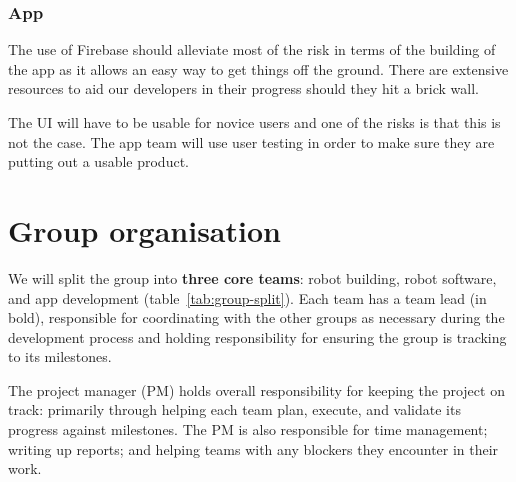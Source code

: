 \documentclass{article}
\begin{document}
\subsubsection{App}

The use of Firebase should alleviate most of the risk in terms of the building of the app as it allows an easy way to get things off the ground. There are extensive resources to aid our developers in their progress should they hit a brick wall.

The UI will have to be usable for novice users and one of the risks is that this is not the case. The app team will use user testing in order to make sure they are putting out a usable product.


\section{Group organisation}
\begin{table}[]
  \caption{Team splits across the group. Names in bold are key points of contact.}
  \label{tab:group-split}
\end{table}

We will split the group into {\bf three core teams}: robot building, robot software, and app development (table~\ref{tab:group-split}). Each team has a team lead (in bold), responsible for coordinating with the other groups as necessary during the development process and holding responsibility for ensuring the group is tracking to its milestones.

The project manager (PM) holds overall responsibility for keeping the project on track: primarily through helping each team plan, execute, and validate its progress against milestones. The PM is also responsible for time management; writing up reports; and helping teams with any blockers they encounter in their work.
\end{document}
